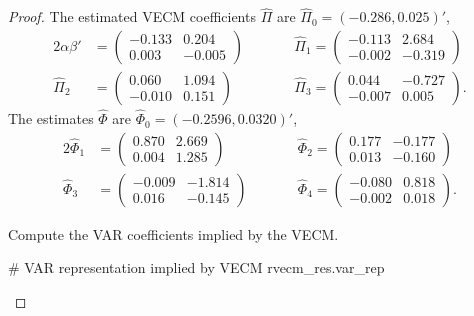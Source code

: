 \documentclass[oneside,reqno]{amsart}
\theoremstyle{definition}
\begin{document}
\begin{enumerate}[label=(\roman*)]
\begin{proof}
The estimated VECM coefficients $\widehat \Pi$ are $\widehat\Pi_0 = (-0.286, 0.025)'$,
\begin{alignat*}{2}
	\alpha\beta' &= \begin{pmatrix}
		  -0.133 & 0.204  \\
		  0.003 & -0.005
	\end{pmatrix}  \qquad &&
	\widehat\Pi_1 = \begin{pmatrix}
		-0.113 & 2.684 \\
		 -0.002 & -0.319
	\end{pmatrix} \\
	\widehat\Pi_2 &=\begin{pmatrix}
		0.060 &  1.094 \\
		 -0.010 & 0.151
	\end{pmatrix} \qquad &&
	\widehat\Pi_3 = \begin{pmatrix}
		0.044 &  -0.727 \\
		 -0.007 & 0.005
	\end{pmatrix}.
\end{alignat*}
The estimates $\widehat \Phi$ are $\widehat \Phi_0 = (-0.2596,0.0320)'$,
\begin{alignat*}{2}
	\widehat \Phi_1 &= \begin{pmatrix}
		 0.870 &  2.669 \\
		 0.004 & 1.285
	\end{pmatrix} \qquad &&
	\widehat \Phi_2= \begin{pmatrix}
		0.177 & -0.177 \\
		 0.013 & -0.160
		\end{pmatrix} \\
	\widehat \Phi_3 &= \begin{pmatrix}
		 -0.009 & -1.814 \\
		 0.016 & -0.145 
	\end{pmatrix} \qquad&&
	\widehat \Phi_4  = \begin{pmatrix}
		-0.080 &  0.818 \\
		 -0.002 & 0.018
	\end{pmatrix}.
\end{alignat*}

Compute the VAR coefficients implied by the VECM.
\begin{python3code}
# VAR representation implied by VECM
rvecm_res.var_rep
\end{python3code}


\end{proof}
\end{enumerate}
\end{document}

